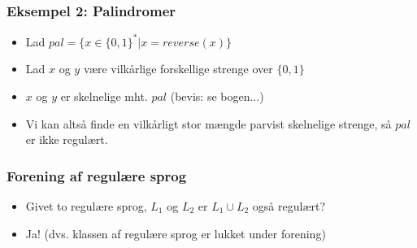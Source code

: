 \documentclass[]{beamer}
\begin{document}
\begin{frame}
  \frametitle{Eksempel 2: Palindromer}
  \begin{itemize}[<+->]
  \item Lad $pal = \{ x∈\{0,1\}^* | x=reverse(x) \}$
\item Lad $x$ og $y$ være vilkårlige forskellige
strenge over $\{0,1\}$
\item $x$ og $y$ er skelnelige mht. $pal$ (bevis: se bogen...) %
\item Vi kan altså finde en vilkårligt stor mængde parvist skelnelige
  strenge, så $pal$ er ikke regulært.

  \end{itemize}
\end{frame}

\begin{frame}
  \frametitle{Forening af regulære sprog}
  \begin{itemize}
  \item  Givet to regulære sprog, $L_1$ og $L_2$
er $L_1 ∪ L_2$ også regulært?
\item Ja!  (dvs. klassen af regulære sprog er lukket under forening)
  \end{itemize}
\end{frame}
\end{document}

